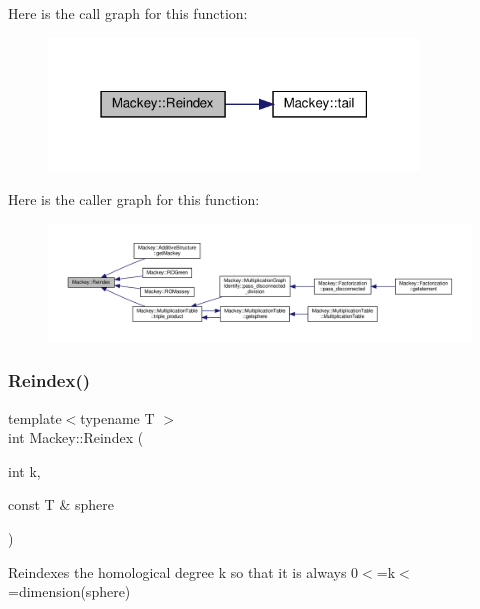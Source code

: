 Here is the call graph for this function\+:\nopagebreak
\begin{figure}[H]
\begin{center}
\leavevmode
\includegraphics[width=279pt]{namespaceMackey_a7da73ade3ee83c4ffd614e79242d7c04_cgraph}
\end{center}
\end{figure}
Here is the caller graph for this function\+:\nopagebreak
\begin{figure}[H]
\begin{center}
\leavevmode
\includegraphics[width=350pt]{namespaceMackey_a7da73ade3ee83c4ffd614e79242d7c04_icgraph}
\end{center}
\end{figure}
\mbox{\label{namespaceMackey_acb84c147d9ee39eac2883a762e3710dd}} 
\subsubsection{\texorpdfstring{Reindex()}{Reindex()}\hspace{0.1cm}{\footnotesize\ttfamily [2/2]}}
{\footnotesize\ttfamily template$<$typename T $>$ \\
int Mackey\+::\+Reindex (\begin{DoxyParamCaption}\item[{int}]{k,  }\item[{const T \&}]{sphere }\end{DoxyParamCaption})\hspace{0.3cm}{\ttfamily [inline]}}



Reindexes the homological degree k so that it is always 0$<$=k$<$=dimension(sphere) 

